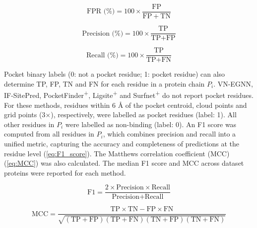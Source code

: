 \vspace{-12pt} %

\begin{equation}
\text{FPR (\%)} = 100 \times \frac{\mathrm{FP}}{\mathrm{FP} + \mathrm{TN}}
\label{eq:FPR}
\end{equation}

\vspace{-12pt} %

\begin{equation}
\text{Precision (\%)} = 100 \times \frac{\text{TP}}{\text{TP} + \text{FP}}
\label{eq:precision}
\end{equation}

\vspace{-12pt} %

\begin{equation}
\text{Recall (\%)} = 100 \times \frac{\text{TP}}{\text{TP} + \text{FN}}
\label{eq:recall}
\end{equation}

\vspace{-12pt} %

Pocket binary labels (0: not a pocket residue; 1: pocket residue) can also determine TP, FP, TN and FN for each residue in a protein chain $P_i$. VN-EGNN, IF-SitePred, PocketFinder\textsuperscript{+}, Ligsite\textsuperscript{+} and Surfnet\textsuperscript{+} do not report pocket residues. For these methods, residues within 6 \AA{} of the pocket centroid, cloud points and grid points (3$\times$), respectively, were labelled as pocket residues (label: 1). All other residues in $P_i$ were labelled as non-binding (label: 0). An F1 score was computed from all residues in $P_i$, which combines precision and recall into a unified metric, capturing the accuracy and completeness of predictions at the residue level (\autoref{eq:F1_score}). The Matthews correlation coefficient (MCC) \cite{MATTHEWS_1975_MCC} (\autoref{eq:MCC}) was also calculated. The median F1 score and MCC across dataset proteins were reported for each method.

\begin{equation}
\text{F1} = \frac{2 \times \text{Precision} \times \text{Recall}}{\text{Precision} + \text{Recall}}
\label{eq:F1_score}
\end{equation}

\begin{equation}
\text{MCC} = \frac{\text{TP} \times \text{TN} - \text{FP} \times \text{FN}}{\sqrt{(\text{TP} + \text{FP})(\text{TP} + \text{FN})(\text{TN} + \text{FP})(\text{TN} + \text{FN})}}
\label{eq:MCC}
\end{equation}

